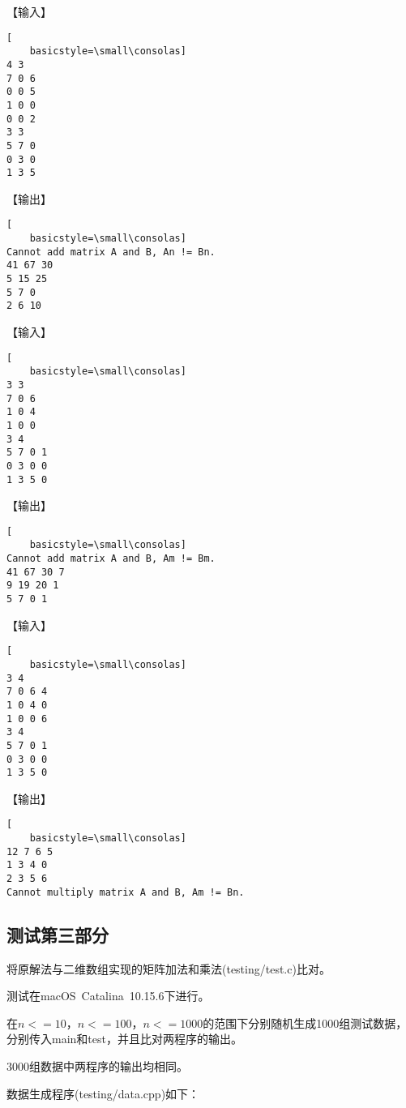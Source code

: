 \documentclass{article}
\begin{document}
【输入】

\begin{lstlisting}[
    basicstyle=\small\consolas]
4 3
7 0 6
0 0 5
1 0 0
0 0 2
3 3
5 7 0
0 3 0
1 3 5
\end{lstlisting}

【输出】

\begin{lstlisting}[
    basicstyle=\small\consolas]
Cannot add matrix A and B, An != Bn.
41 67 30 
5 15 25 
5 7 0 
2 6 10 
\end{lstlisting}

【输入】

\begin{lstlisting}[
    basicstyle=\small\consolas]
3 3
7 0 6
1 0 4
1 0 0
3 4
5 7 0 1
0 3 0 0
1 3 5 0
\end{lstlisting}

【输出】

\begin{lstlisting}[
    basicstyle=\small\consolas]
Cannot add matrix A and B, Am != Bm.
41 67 30 7 
9 19 20 1 
5 7 0 1 
\end{lstlisting}

【输入】

\begin{lstlisting}[
    basicstyle=\small\consolas]
3 4
7 0 6 4
1 0 4 0
1 0 0 6
3 4
5 7 0 1
0 3 0 0
1 3 5 0
\end{lstlisting}

【输出】

\begin{lstlisting}[
    basicstyle=\small\consolas]
12 7 6 5 
1 3 4 0 
2 3 5 6 
Cannot multiply matrix A and B, Am != Bn.
\end{lstlisting}

\subsection{测试第三部分}

将原解法与二维数组实现的矩阵加法和乘法(testing/test.c)比对。

测试在macOS\ Catalina\ 10.15.6下进行。

在$n<=10$，$n<=100$，$n<=1000$的范围下分别随机生成1000组测试数据，分别传入main和test，并且比对两程序的输出。

3000组数据中两程序的输出均相同。

数据生成程序(testing/data.cpp)如下：
\end{document}
